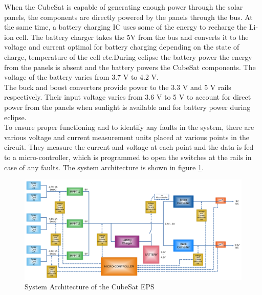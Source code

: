 When the CubeSat is capable of generating enough power through the solar panels, the components are directly powered by the panels through the bus. At the same time, a battery charging IC uses some of the energy to recharge the Li-ion cell. The battery charger takes the 5V from the bus and converts it to the voltage and current optimal for battery charging depending on the state of charge, temperature of the cell etc.During eclipse the battery power the energy from the panels is absent and the battery powers the CubeSat components. The voltage of the battery varies from 3.7 V to 4.2 V.
\\

The buck and boost converters provide power to the 3.3 V and 5 V rails respectively. Their input voltage varies from 3.6 V to 5 V to account for direct power from the panels when sunlight is available and for battery power during eclipse.
\\

To ensure proper functioning and to identify any faults in the system, there are various voltage and current measurement units placed at various points in the circuit. They measure the current and voltage at each point and the data is fed to a micro-controller, which is programmed to open the switches at the rails in case of any faults. The system architecture is shown in figure \ref{fig:mainarch}.

\begin{landscape}
	\begin{figure}[h]
		\centering
		\includegraphics[width=\columnwidth]{IMGS/diag11.pdf}
		\caption{System Architecture of the CubeSat EPS}
		\label{fig:mainarch}
	\end{figure} 
\end{landscape}